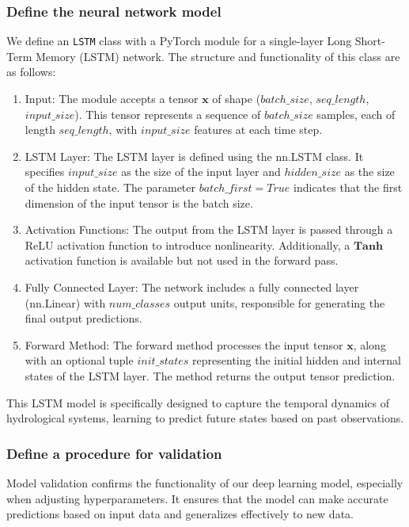 \documentclass{article}
\begin{document}
\subsubsection{Define the neural network model}
\label{methods:define_model}
We define an \texttt{LSTM} class with a PyTorch module for a single-layer Long Short-Term Memory (LSTM) network. The structure and functionality of this class are as follows:

\begin{enumerate}
    \item Input: The module accepts a tensor $\mathbf{x}$ of shape ($batch\_size$, $seq\_length$, $input\_size$). This tensor represents a sequence of $batch\_size$ samples, each of length $seq\_length$, with $input\_size$ features at each time step.
    
    \item LSTM Layer: The LSTM layer is defined using the nn.LSTM class. It specifies $input\_size$ as the size of the input layer and $hidden\_size$ as the size of the hidden state. The parameter $batch\_first=True$ indicates that the first dimension of the input tensor is the batch size.
   
    \item Activation Functions: The output from the LSTM layer is passed through a ReLU activation function to introduce non\-linearity. Additionally, a $\mathbf{Tanh}$ activation function is available but not used in the forward pass.
    
    \item Fully Connected Layer: The network includes a fully connected layer (nn.Linear) with $num\_classes$ output units, responsible for generating the final output predictions.
    
    \item Forward Method: The forward method processes the input tensor $\mathbf{x}$, along with an optional tuple $init\_states$ representing the initial hidden and internal states of the LSTM layer. The method returns the output tensor prediction.
    
\end{enumerate}

This LSTM model is specifically designed to capture the temporal dynamics of hydrological systems, learning to predict future states based on past observations.

\subsubsection{Define a procedure for validation}
\label{methods:val}
Model validation confirms the functionality of our deep learning model, especially when adjusting hyperparameters. It ensures that the model can make accurate predictions based on input data and generalizes effectively to new data.
\end{document}
